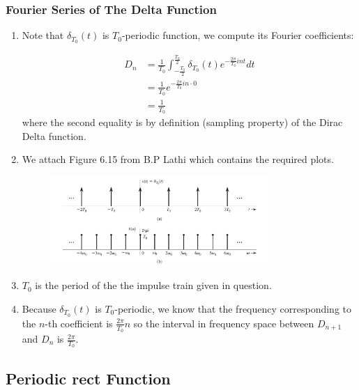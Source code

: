 \subsubsection{Fourier Series of The Delta Function}
\begin{enumerate}
  \item Note that $\delta_{T_0}(t)$ is $T_0$-periodic function, we compute its Fourier coefficients:

  \begin{equation} \label{eq:train_coeff}
    \begin{aligned}
        D_n &= \frac{1}{T_0} \int_{-\frac{T_0}{2}}^{\frac{T_0}{2}} \delta_{T_0}(t) e^{- \frac{2\pi}{T_0} i n t} dt \\
        &= \frac{1}{T_0} e^{- \frac{2\pi}{T_0} i n \cdot 0} \\
        &= \frac{1}{T_0}
    \end{aligned}
  \end{equation}
  where the second equality is by definition (sampling property) of the Dirac Delta function.

  \item We attach Figure 6.15 from B.P Lathi which contains the required plots.
    \begin{figure}[h]
        \centering
        \includegraphics[width=0.78\textwidth]{train.png}
    \end{figure}

    \item $T_0$ is the period of the the impulse train given in question.

    \item Because $\delta_{T_0}(t)$ is $T_0$-periodic, we know that the frequency corresponding to the $n$-th coefficient is $\frac{2\pi}{T_0}n$
      so the interval in frequency space between $D_{n+1}$ and $D_n$ is $\frac{2\pi}{T_0}$.

\end{enumerate}

\subsection{Periodic rect Function}

